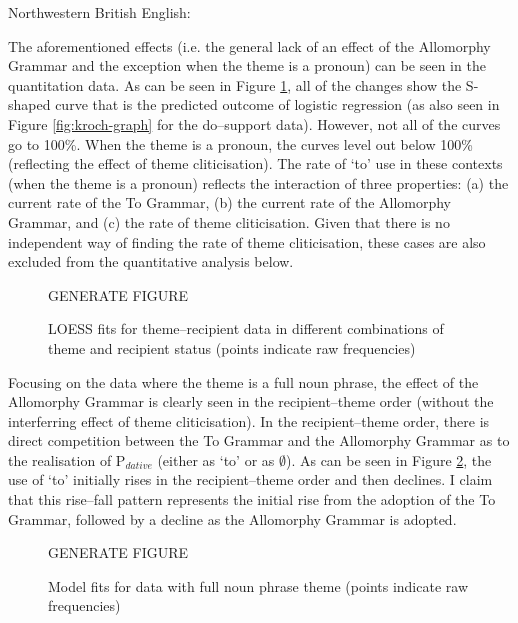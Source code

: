 	\begin{exe}
		 Northwestern British English:
		\begin{xlist}
	\end{xlist}
	\end{exe}

	The aforementioned effects (i.e. the general lack of an effect of the Allomorphy Grammar and the exception when the theme is a pronoun) can be seen in the quantitation data. As can be seen in Figure \ref{fig:brit-tr}, all of the changes show the S-shaped curve that is the predicted outcome of logistic regression (as also seen in Figure \ref{fig:kroch-graph} for the do--support data). However, not all of the curves go to 100\%. When the theme is a pronoun, the curves level out below 100\% (reflecting the effect of theme cliticisation). The rate of `to' use in these contexts (when the theme is a pronoun) reflects the interaction of three properties: (a) the current rate of the To Grammar, (b) the current rate of the Allomorphy Grammar, and (c) the rate of theme cliticisation. Given that there is no independent way of finding the rate of theme cliticisation, these cases are also excluded from the quantitative analysis below.

	\begin{figure}[ht!]
		GENERATE FIGURE
		\caption{LOESS fits for theme--recipient data in different combinations of theme and recipient status (points indicate raw frequencies)}
		\label{fig:brit-tr}
	\end{figure}

	Focusing on the data where the theme is a full noun phrase, the effect of the Allomorphy Grammar is clearly seen in the recipient--theme order (without the interferring effect of theme cliticisation). In the recipient--theme order, there is direct competition between the To Grammar and the Allomorphy Grammar as to the realisation of P$_{dative}$ (either as `to' or as $\emptyset$). As can be seen in Figure \ref{fig:brit-tn}, the use of `to' initially rises in the recipient--theme order and then declines. I claim that this rise--fall pattern represents the initial rise from the adoption of the To Grammar, followed by a decline as the Allomorphy Grammar is adopted.

	\begin{figure}
		GENERATE FIGURE
		\caption{Model fits for data with full noun phrase theme (points indicate raw frequencies)}
		\label{fig:brit-tn}
	\end{figure}
	
